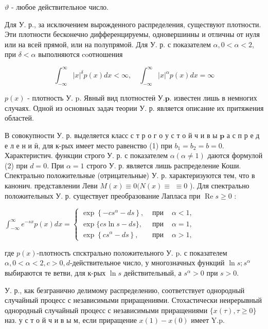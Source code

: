 \documentclass[10pt]{article}
\begin{document}
$\vartheta$ - любое действительное число.



Для У. р., за исключением вырожденного распределения, существуют плотности. Эти плотности бесконечно дифференцируемы, одновершинны и отличны от нуля или на всей прямой, или на полупрямой. Для У. р. с показателем $\alpha, 0<\alpha<2$, при $\delta<\alpha$ выполняются coотношения



\[

\int_{-\infty}^{\infty}|x|^{\delta} p(x) d x<\infty, \quad \int_{-\infty}^{\infty}|x|^{\alpha} p(x) d x=\infty

\]



$p(x)$ - плотность У. p. Явный вид плотностеӥ $\mathrm{У} . \mathbf{p}$. известен лишь в немногих случаях. Одной из основных задач теории У. р. является описание их притяжения областей.



В совокупности У. р. выделяется класс с т р о г о у с т о й ч и в ы $\mathbf{p}$ а с п р е д е л е н и ӥ, для к-рых имеет место равенство (1) при $b_{1}=b_{2}=b=0$. Характеристич. функции строго У. р. с показателем $\alpha(\alpha \neq 1)$ даются формулой (2) при $d=0$. При $\alpha=1$ строго У. р. является лишь распределение Коши. Спектрально положительные (отрицательные) У. р. характеризуются тем, что в канонич. представлении Леви $M(x) \equiv 0(N(x) \equiv$ $\equiv 0$ ). Для спектрально положительных У. р. существует преобразование Лапласа при $\operatorname{Re} s \geqslant 0$ :



$\int_{-\infty}^{\infty} e^{-s x} p(x) d x=\left\{\begin{array}{lll}\exp \left\{-c s^{\alpha}-d s\right\}, & \text { при } & \alpha<1, \\ \exp \{c s \ln s-d s\}, & \text { при } & \alpha=1, \\ \exp \left\{c s^{\alpha}-d s\right\}, & \text { при } & \alpha>1,\end{array}\right.$



где $p(x)$-плотность спсктрально положительного У. p. с показателем $\alpha, 0<\alpha<2, c>0, d$-действительное число, у многозначных функций $\ln s ; s^{\alpha}$ выбираются те ветви, для к-рых $\ln s$ действительный, а $s^{\alpha}>0$ при $s>0$.



У. р., как безгранично делимому распределению, соответствует однородный случайный процесс с независимыми приращениями. Стохастически неирерывный однородный случайный процесс с независимыми приращениями $\{x(\tau), \tau \geqslant 0\}$ наз. у с т о й ч и в ы м, если приращение $x(1)-x(0)$ имеет $\mathrm{Y} . \mathrm{p}$.
\end{document}
